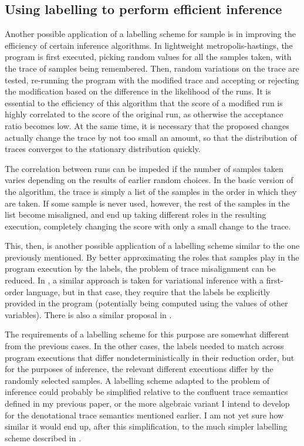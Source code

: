 \documentclass[titlepage]{article}
\begin{document}
\subsection{Using labelling to perform efficient inference}
Another possible application of a labelling scheme for sample is in improving the efficiency of certain inference algorithms. In lightweight metropolis-hastings, the program is first executed, picking random values for all the samples taken, with the trace of samples being remembered. Then, random variations on the trace are tested, re-running the program with the modified trace and accepting or rejecting the modification based on the difference in the likelihood of the runs. It is essential to the efficiency of this algorithm that the score of a modified run is highly correlated to the score of the original run, as otherwise the acceptance ratio becomes low. At the same time, it is necessary that the proposed changes actually change the trace by not too small an amount, so that the distribution of traces converges to the stationary distribution quickly.

The correlation between runs can be impeded if the number of samples taken varies depending on the results of earlier random choices. In the basic version of the algorithm, the trace is simply a list of the samples in the order in which they are taken. If some sample is never used, however, the rest of the samples in the list become misaligned, and end up taking different roles in the resulting execution, completely changing the score with only a small change to the trace.

This, then, is another possible application of a labelling scheme similar to the one previously mentioned. By better approximating the roles that samples play in the program execution by the labels, the problem of trace misalignment can be reduced. In \cite{lee2019towards}, a similar approach is taken for variational inference with a first-order language, but in that case, they require that the labels be explicitly provided in the program (potentially being computed using the values of other variables). There is also a similar proposal in \cite{pmlr-v15-wingate11a}.

The requirements of a labelling scheme for this purpose are somewhat different from the previous cases. In the other cases, the labels needed to match across program executions that differ nondeterministically in their reduction order, but for the purposes of inference, the relevant different executions differ by the randomly selected samples. A labelling scheme adapted to the problem of inference could probably be simplified relative to the confluent trace semantics defined in my previous paper, or the more algebraic variant I intend to develop for the denotational trace semantics mentioned earlier. I am not yet sure how similar it would end up, after this simplification, to the much simpler labelling scheme described in \cite{pmlr-v15-wingate11a}.
\end{document}
